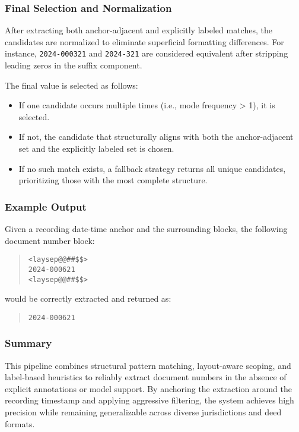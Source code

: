 \documentclass{article}
\begin{document}
\subsubsection{Final Selection and Normalization}

After extracting both anchor-adjacent and explicitly labeled matches, the candidates are normalized to eliminate superficial formatting differences. For instance, \texttt{2024-000321} and \texttt{2024-321} are considered equivalent after stripping leading zeros in the suffix component.

The final value is selected as follows:

\begin{itemize}
    \item If one candidate occurs multiple times (i.e., mode frequency > 1), it is selected.
    \item If not, the candidate that structurally aligns with both the anchor-adjacent set and the explicitly labeled set is chosen.
    \item If no such match exists, a fallback strategy returns all unique candidates, prioritizing those with the most complete structure.
\end{itemize}

\subsubsection{Example Output}

Given a recording date-time anchor and the surrounding blocks, the following document number block:

\begin{quote}
\texttt{<laysep@@\#\#\$\$>\\2024-000621\\<laysep@@\#\#\$\$>}
\end{quote}

would be correctly extracted and returned as:

\begin{quote}
\texttt{2024-000621}
\end{quote}

\subsubsection{Summary}

This pipeline combines structural pattern matching, layout-aware scoping, and label-based heuristics to reliably extract document numbers in the absence of explicit annotations or model support. By anchoring the extraction around the recording timestamp and applying aggressive filtering, the system achieves high precision while remaining generalizable across diverse jurisdictions and deed formats.
\end{document}

